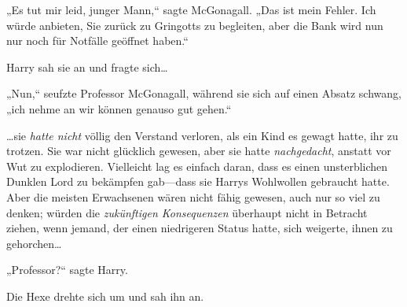 „Es tut mir leid, junger Mann,“ sagte McGonagall. „Das ist mein Fehler. Ich würde anbieten, Sie zurück zu Gringotts zu begleiten, aber die Bank wird nun nur noch für Notfälle geöffnet haben.“

Harry sah sie an und fragte sich…

„Nun,“ seufzte Professor McGonagall, während sie sich auf einen Absatz schwang, „ich nehme an wir können genauso gut gehen.“

…sie \emph{hatte nicht} völlig den Verstand verloren, als ein Kind es gewagt hatte, ihr zu trotzen. Sie war nicht glücklich gewesen, aber sie hatte \emph{nachgedacht}, anstatt vor Wut zu explodieren. Vielleicht lag es einfach daran, dass es einen unsterblichen Dunklen Lord zu bekämpfen gab—dass sie Harrys Wohlwollen gebraucht hatte. Aber die meisten Erwachsenen wären nicht fähig gewesen, auch nur so viel zu denken; würden die \emph{zukünftigen Konsequenzen} überhaupt nicht in Betracht ziehen, wenn jemand, der einen niedrigeren Status hatte, sich weigerte, ihnen zu gehorchen…

„Professor?“ sagte Harry.

Die Hexe drehte sich um und sah ihn an.

